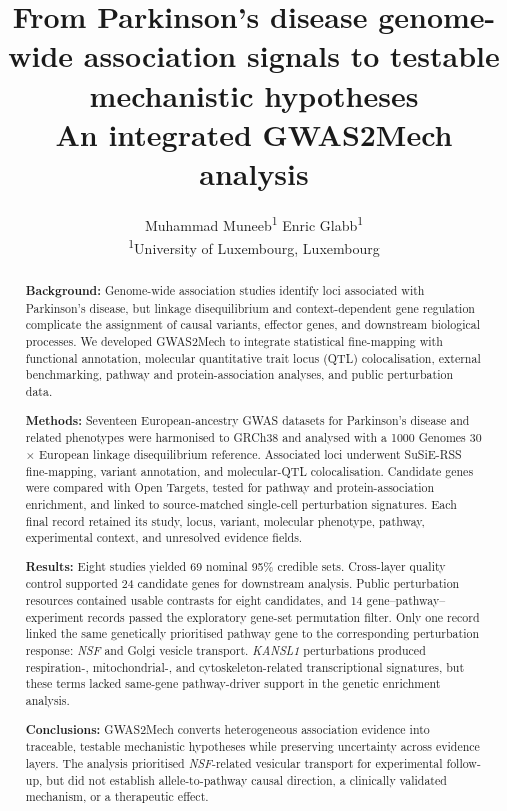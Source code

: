\documentclass[11pt,a4paper]{article}
\title{
    \textbf{From Parkinson's disease genome-wide association signals to testable mechanistic hypotheses}\\[0.3cm]
    \large An integrated GWAS2Mech analysis
}
\author{Muhammad Muneeb\textsuperscript{1} \quad Enric Glabb\textsuperscript{1}\\[0.4em]
\small \textsuperscript{1}University of Luxembourg, Luxembourg}
\date{}
\begin{document}
\maketitle

\begin{abstract}
\noindent\textbf{Background:} Genome-wide association studies identify loci associated with Parkinson's disease, but linkage disequilibrium and context-dependent gene regulation complicate the assignment of causal variants, effector genes, and downstream biological processes. We developed GWAS2Mech to integrate statistical fine-mapping with functional annotation, molecular quantitative trait locus (QTL) colocalisation, external benchmarking, pathway and protein-association analyses, and public perturbation data.

\noindent\textbf{Methods:} Seventeen European-ancestry GWAS datasets for Parkinson's disease and related phenotypes were harmonised to GRCh38 and analysed with a 1000 Genomes 30$\times$ European linkage disequilibrium reference. Associated loci underwent SuSiE-RSS fine-mapping, variant annotation, and molecular-QTL colocalisation. Candidate genes were compared with Open Targets, tested for pathway and protein-association enrichment, and linked to source-matched single-cell perturbation signatures. Each final record retained its study, locus, variant, molecular phenotype, pathway, experimental context, and unresolved evidence fields.

\noindent\textbf{Results:} Eight studies yielded 69 nominal 95\% credible sets. Cross-layer quality control supported 24 candidate genes for downstream analysis. Public perturbation resources contained usable contrasts for eight candidates, and 14 gene--pathway--experiment records passed the exploratory gene-set permutation filter. Only one record linked the same genetically prioritised pathway gene to the corresponding perturbation response: \textit{NSF} and Golgi vesicle transport. \textit{KANSL1} perturbations produced respiration-, mitochondrial-, and cytoskeleton-related transcriptional signatures, but these terms lacked same-gene pathway-driver support in the genetic enrichment analysis.

\noindent\textbf{Conclusions:} GWAS2Mech converts heterogeneous association evidence into traceable, testable mechanistic hypotheses while preserving uncertainty across evidence layers. The analysis prioritised \textit{NSF}-related vesicular transport for experimental follow-up, but did not establish allele-to-pathway causal direction, a clinically validated mechanism, or a therapeutic effect.
\end{abstract}
\end{document}
